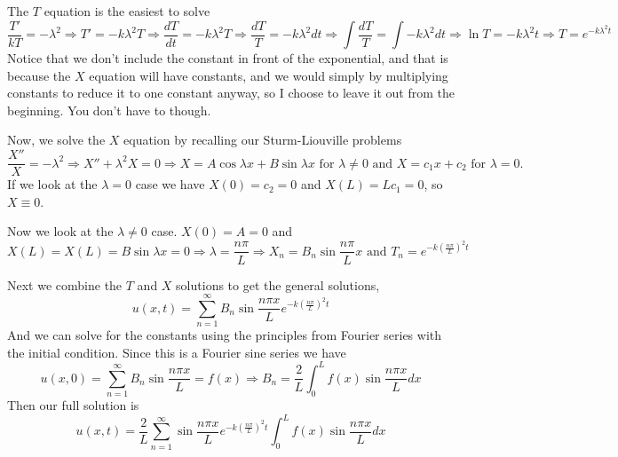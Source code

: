 \documentclass[reqno]{amsart}
\theoremstyle{definition}
\begin{document}
The $T$ equation is the easiest to solve
%
\begin{equation*}
\frac{T'}{kT} = -\lambda^2 \Rightarrow T' = -k\lambda^2 T
\Rightarrow \frac{dT}{dt} =  -k\lambda^2 T \Rightarrow
\frac{dT}{T} = -k\lambda^2 dt \Rightarrow \int \frac{dT}{T} = \int -k\lambda^2 dt
\Rightarrow \ln T = -k\lambda^2 t \Rightarrow T = e^{-k\lambda^2 t}
\end{equation*}
%
Notice that we don't include the constant in front of the exponential, and that
is because the $X$ equation will have constants, and we would simply by multiplying
constants to reduce it to one constant anyway, so I choose to leave it out from the
beginning.  You don't have to though.

Now, we solve the $X$ equation by recalling our Sturm-Liouville problems
%
\begin{equation*}
\frac{X''}{X} = -\lambda^2 \Rightarrow X'' + \lambda^2 X = 0
\Rightarrow X = A\cos\lambda x + B\sin\lambda x \text{  for $\lambda \neq 0$ and  }
X = c_1x + c_2 \text{  for $\lambda = 0$.}
\end{equation*}
%
If we look at the $\lambda = 0$ case we have $X(0) = c_2 = 0$
and $X(L) = Lc_1 = 0$, so $X \equiv 0$.

Now we look at the $\lambda \neq 0$ case.  $X(0) = A = 0$ and
%
\begin{equation*}
X(L) = X(L) = B\sin\lambda x = 0 \Rightarrow \lambda = \frac{n\pi}{L}
\Rightarrow X_n = B_n\sin\frac{n\pi}{L}x \text{  and  }
T_n = e^{-k\left(\frac{n\pi}{L}\right)^2 t}
\end{equation*}

Next we combine the $T$ and $X$ solutions to get the general solutions,
%
\begin{equation}
u(x,t) = \sum_{n=1}^\infty B_n\sin\frac{n\pi x}{L}e^{-k\left(\frac{n\pi}{L}\right)^2 t}
\end{equation}
%
And we can solve for the constants using the principles from Fourier series
with the initial condition.
Since this is a Fourier sine series we have
%
\begin{equation*}
u(x,0) = \sum_{n=1}^\infty B_n\sin\frac{n\pi x}{L} = f(x)
\Rightarrow B_n = \frac{2}{L}\int_0^L f(x)\sin\frac{n\pi x}{L}dx
\end{equation*}
%
Then our full solution is
%
\begin{equation}
u(x,t) = \frac{2}{L}\sum_{n=1}^\infty \sin\frac{n\pi x}{L}e^{-k\left(\frac{n\pi}{L}\right)^2 t}
\int_0^L f(x)\sin\frac{n\pi x}{L}dx
\end{equation}
\end{document}
